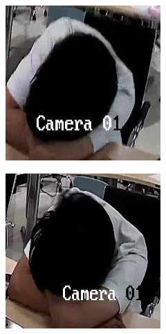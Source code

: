 \begin{figure}[!ht]
\begin{subfigure}[b]{0.45\linewidth}
    \end{subfigure}
    \begin{subfigure}[b]{0.45\linewidth}
      \includegraphics[width=\linewidth]{appendix/sleep/000_CXS0_D0_000069.jpg}
    \end{subfigure}
    \begin{subfigure}[b]{0.45\linewidth}
      \includegraphics[width=\linewidth]{appendix/sleep/002_CXS0_D0_000782.jpg}

\end{subfigure}
\end{figure}
